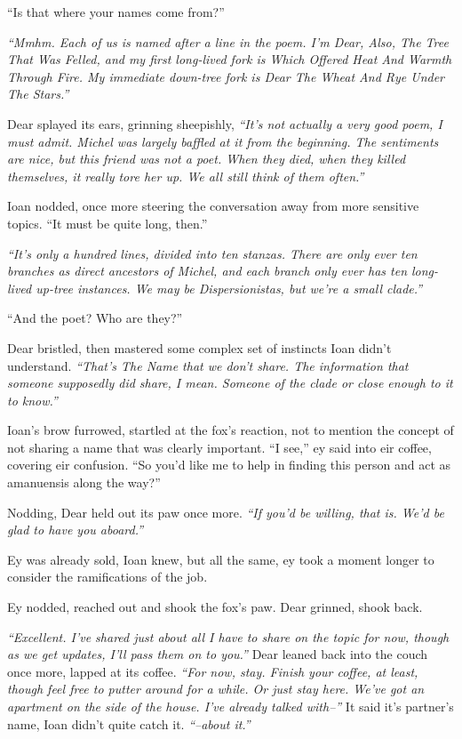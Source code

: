 ``Is that where your names come from?''

\emph{``Mmhm. Each of us is named after a line in the poem. I'm Dear, Also, The Tree That Was Felled, and my first long-lived fork is Which Offered Heat And Warmth Through Fire. My immediate down-tree fork is Dear The Wheat And Rye Under The Stars.''}

Dear splayed its ears, grinning sheepishly, \emph{``It's not actually a very good poem, I must admit. Michel was largely baffled at it from the beginning. The sentiments are nice, but this friend was not a poet. When they died, when they killed themselves, it really tore her up. We all still think of them often.''}

Ioan nodded, once more steering the conversation away from more sensitive topics. ``It must be quite long, then.''

\emph{``It's only a hundred lines, divided into ten stanzas. There are only ever ten branches as direct ancestors of Michel, and each branch only ever has ten long-lived up-tree instances. We may be Dispersionistas, but we're a small clade.''}

``And the poet? Who are they?''

Dear bristled, then mastered some complex set of instincts Ioan didn't understand. \emph{``That's The Name that we don't share. The information that someone supposedly did share, I mean. Someone of the clade or close enough to it to know.''}

Ioan's brow furrowed, startled at the fox's reaction, not to mention the concept of not sharing a name that was clearly important. ``I see,'' ey said into eir coffee, covering eir confusion. ``So you'd like me to help in finding this person and act as amanuensis along the way?''

Nodding, Dear held out its paw once more. \emph{``If you'd be willing, that is. We'd be glad to have you aboard.''}

Ey was already sold, Ioan knew, but all the same, ey took a moment longer to consider the ramifications of the job.

Ey nodded, reached out and shook the fox's paw. Dear grinned, shook back.

\emph{``Excellent. I've shared just about all I have to share on the topic for now, though as we get updates, I'll pass them on to you.''} Dear leaned back into the couch once more, lapped at its coffee. \emph{``For now, stay. Finish your coffee, at least, though feel free to putter around for a while. Or just stay here. We've got an apartment on the side of the house. I've already talked with--''} It said it's partner's name, Ioan didn't quite catch it. \emph{``--about it.''}

